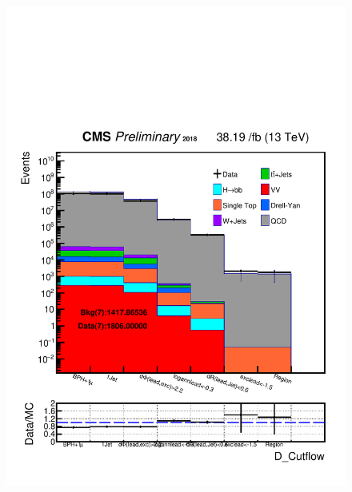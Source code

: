 \begin{figure}[h!]
   \includegraphics[width=0.47\linewidth]{figs/Data_log_CutflAnalysisNote_MS-15_ctauS-10_D_Cutflow.pdf}
 \end{figure}



